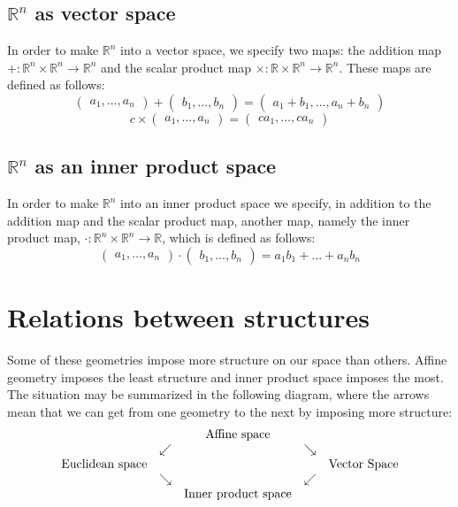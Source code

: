 \documentclass{article}
\begin{document}
\subsection{$\mathbb{R}^n$ as vector space}

In order to make $\mathbb{R}^n$ into a vector space, we specify two maps: the addition map $+ \colon \mathbb{R}^n \times \mathbb{R}^n \to \mathbb{R}^n$ and the scalar product map $\times \colon \mathbb{R} \times \mathbb{R}^n \to \mathbb{R}^n$.  These maps are defined as follows:
 $$\begin{pmatrix} a_1, \ldots,  a_n \end{pmatrix} + \begin{pmatrix} b_1, \ldots, b_n \end{pmatrix} = 
\begin{pmatrix} a_1 + b_1, \ldots, a_n + b_n \end{pmatrix}$$
 $$c \times \begin{pmatrix} a_1, \ldots, a_n \end{pmatrix}
 = \begin{pmatrix} c a_1, \ldots, c a_n \end{pmatrix}$$

\subsection{$\mathbb{R}^n$ as an inner product space}

In order to make $\mathbb{R}^n$ into an inner product space we specify, in addition to the addition map and the scalar product map, another map, namely the inner product map, $\cdot \colon \mathbb{R}^n \times \mathbb{R}^n \to \mathbb{R}$, which is defined as follows:
 $$\begin{pmatrix} a_1, \ldots, a_n \end{pmatrix} \cdot
 \begin{pmatrix} b_1, \ldots, b_n \end{pmatrix} = 
a_1 b_1 + \ldots + a_n b_n$$

\section{Relations between structures}

Some of these geometries impose more structure on our space than others.  Affine geometry imposes the least structure and inner product space imposes the most.  The situation may be summarized in the following diagram, where the arrows mean that we can get from one geometry to the next by imposing more structure:
  $$\begin{matrix} & & \hbox{Affine space} & & \\
& \swarrow & & \searrow & \\
\hbox{Euclidean space} & & & & \hbox{Vector Space} \\
& \searrow & & \swarrow & \\
& & \hbox{Inner product space} & & \\ \end{matrix}$$
\end{document}
